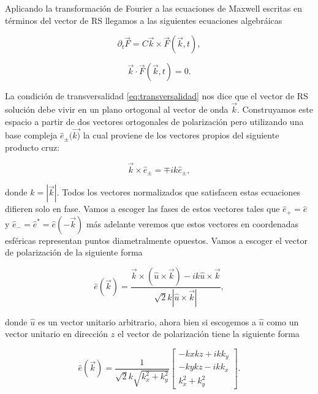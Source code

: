             Aplicando la transformación de Fourier a las ecuaciones de Maxwell escritas en términos del vector de RS llegamos a las siguientes ecuaciones algebráicas

            \begin{equation}\label{eq:RSEvolution}
                \partial_t \Vec{F} = C \Vec{k}\times \Vec{F}(\Vec{k},t),
            \end{equation}

            \begin{equation}\label{eq:transversalidad}
                \Vec{k}\cdot \Vec{F}(\Vec{k},t) = 0.
            \end{equation}

            La condición de transversalidad \ref{eq:transversalidad} nos dice que el vector de RS solución debe vivir en un plano ortogonal al vector de onda $\Vec{k}$. Construyamos este espacio a partir de dos vectores ortogonales de polarización pero utilizando una base compleja $\hat{e}_{\pm}(\Vec{k)}$ la cual proviene de los vectores propios del siguiente producto cruz:

            \begin{equation}
                \Vec{k}\times \hat{e}_{\pm} = \mp ik\hat{e}_{\pm},
            \end{equation}

            donde $k = |\Vec{k}|$. Todos los vectores normalizados que satisfacen estas ecuaciones difieren solo en fase. Vamos a escoger las fases de estos vectores tales que $\hat{e}_+ = \hat{e}$ y $\hat{e}_- = \hat{e}^* = \hat{e}(-\Vec{k})$ más adelante veremos que estos vectores en coordenadas esféricas representan puntos diametralmente opuestos. Vamos a escoger el vector de polarización de la siguiente forma

            \begin{equation}
                \hat{e}(\Vec{k}) = \frac{\Vec{k}\times(\hat{u}\times \Vec{k}) - ik \hat{u}\times \Vec{k}}{\sqrt{2}k|\hat{u}\times\Vec{k}|},
            \end{equation}

            donde $\hat{u}$ es un vector unitario arbitrario, ahora bien si escogemos a $\hat{u}$ como un vector unitario en dirección $z$ el vector de polarización tiene la siguiente forma

            \begin{equation}
                \hat{e}(\Vec{k}) = 
                \frac{1}{\sqrt{2}k\sqrt{k_x^2 + k_y^2}}
                \begin{bmatrix}
                    -kxkz + ikk_y\\
                    -kykz - ikk_x\\
                    k_x^2 + k_y^2
                \end{bmatrix}.
            \end{equation}


